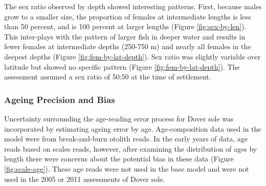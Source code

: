\documentclass[11pt,
  english,
  a4paper,
]{article}
\begin{document}
\leavevmode\tagmcend\tagstructend


The sex ratio observed by depth showed interesting patterns. First, because males grow to a smaller size, the proportion of females at intermediate lengths is less than 50 percent, and is 100 percent at larger lengths (Figure \ref{fig:sex-by-len}). This inter-plays with the pattern of larger fish in deeper water and results in fewer females at intermediate depths (250-750 m) and nearly all females in the deepest depths (Figure \ref{fig:fem-by-lat-depth}). Sex ratio was slightly variable over latitude but showed no specific pattern (Figure \ref{fig:fem-by-lat-depth}). The assessment assumed a sex ratio of 50:50 at the time of settlement.

\leavevmode\tagmcend\tagstructend\par


\hypertarget{ageing-precision-and-bias}{%
\subsubsection{Ageing Precision and Bias}\label{ageing-precision-and-bias}}

\leavevmode\tagmcend\tagstructend


Uncertainty surrounding the age-reading error process for Dover sole was incorporated by estimating ageing error by age. Age-composition data used in the model were from break-and-burn otolith reads. In the early years of data, age reads based on scales reads, however, after examining the distribution of ages by length there were concerns about the potential bias in these data (Figure \ref{fig:scale-age}). These age reads were not used in the base model and were not used in the 2005 or 2011 assessments of Dover sole.

\leavevmode\tagmcend\tagstructend\par

\end{document}
